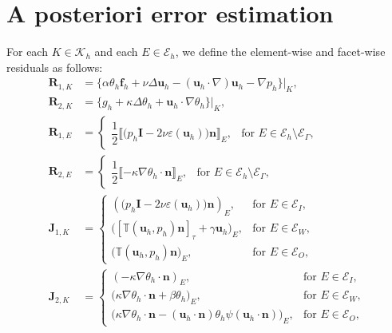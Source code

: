 \documentclass[10pt,a4paper]{article}
\begin{document}
\section{A posteriori error estimation}\label{section5}
For each  $K \in \mathcal{K}_h$ and
each $E \in \mathcal{E}_h$, we define the element-wise and facet-wise residuals as follows:
\begin{align*}
    \mathbf{R}_{1,K} & = \{ \alpha \theta_h \boldsymbol{f}_h + \nu \Delta \boldsymbol{u}_h - (\boldsymbol{u}_h \cdot \nabla )\boldsymbol{u}_h - \nabla p_h \}|_K, \\
    \mathbf{R}_{2,K} & = \{ g_h + \kappa \Delta \theta_h + \boldsymbol{u}_h \cdot \nabla \theta_h \}|_K, \\
  \mathbf{R}_{1,E}  &=
\begin{cases}
\dfrac{1}{2}
\llbracket
\bigl(p_h \boldsymbol{I}
- 2 \nu \varepsilon(\boldsymbol{u}_h)\bigr)\boldsymbol{n}
\rrbracket_E,
& \text{for } E \in \mathcal{E}_h \setminus \mathcal{E}_\Gamma,
\end{cases} \\
\mathbf{R}_{2,E}  &=
\begin{cases}
\dfrac{1}{2}
\llbracket
-\kappa  \nabla \theta_h \cdot \boldsymbol{n}
\rrbracket_E,
& \text{for } E \in \mathcal{E}_h \setminus \mathcal{E}_\Gamma ,
\end{cases} \\
\boldsymbol{J}_{1,K} &=
\begin{cases}
\left(\bigl(p_h \boldsymbol{I}
- 2 \nu \varepsilon(\boldsymbol{u}_h)\bigr)\boldsymbol{n} \right)_E,
& \text{for } E \in \mathcal{E}_I,\\ 
\bigl( \left[ \mathbb{T}(\boldsymbol{u}_h,p_h) \boldsymbol{n} \right]_{\tau} + \gamma \boldsymbol{u}_h \bigr)_E, & \text{for } E \in \mathcal{E}_W, \\
\bigl(\mathbb{T}(\boldsymbol{u}_h,p_h) \boldsymbol{n}\bigr)_E, & \text{for } E \in  \mathcal{E}_O,
\end{cases} \\
\mathbf{J}_{2,K}  &=
\begin{cases}
\left(-\kappa  \nabla \theta_h \cdot \boldsymbol{n}\right)_E, & \text{for } E \in \mathcal{E}_I,  \\
\bigl( \kappa  \nabla \theta_h \cdot \boldsymbol{n}  + \beta \theta_h \bigr)_E, & \text{for } E \in \mathcal{E}_W, \\
\bigl( \kappa  \nabla \theta_h \cdot \boldsymbol{n} - (\boldsymbol{u}_h \cdot \boldsymbol{n}) \theta_h \psi(\boldsymbol{u}_h \cdot \boldsymbol{n}) \bigr)_E, & \text{for } E \in \mathcal{E}_O,
\end{cases}
\end{align*} 
\end{document}
